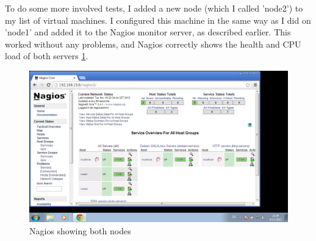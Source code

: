 \documentclass[12pt]{report}
\begin{document}
To do some more involved tests, I added a new node (which I called
'node2') to my list of virtual machines. I configured this machine in
the same way as I did on 'node1' and added it to the Nagios monitor
server, as described earlier.
This worked without any problems, and Nagios correctly shows the health
and CPU load of both servers 
\cref{fig:nagios_nrpe_also_node2}.

\begin{figure}[h!]
  \caption{Nagios showing both nodes}
  \label{fig:nagios_nrpe_also_node2}
  \centering
    \includegraphics[scale=0.3]{pics/nagios_3.png}
\end{figure}
\end{document}
